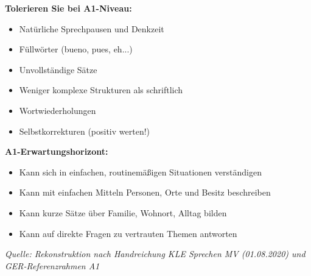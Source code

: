\documentclass[11pt, a4paper]{article}
\begin{document}
\begin{tcolorbox}[colback=hellgrau, colframe=rahmen, boxrule=0.5pt, arc=0pt,
    left=8pt, right=8pt, top=6pt, bottom=6pt,
    title={\textbf{Hinweise zur Bewertung (A1-Niveau)}},
    coltitle=black, colbacktitle=mittelgrau]

\textbf{Tolerieren Sie bei A1-Niveau:}
\begin{itemize}[leftmargin=1.5em, itemsep=1pt, topsep=2pt]
    \item Natürliche Sprechpausen und Denkzeit
    \item Füllwörter (bueno, pues, eh...)
    \item Unvollständige Sätze
    \item Weniger komplexe Strukturen als schriftlich
    \item Wortwiederholungen
    \item Selbstkorrekturen (positiv werten!)
\end{itemize}

\vspace{4pt}

\textbf{A1-Erwartungshorizont:}
\begin{itemize}[leftmargin=1.5em, itemsep=1pt, topsep=2pt]
    \item Kann sich in einfachen, routinemäßigen Situationen verständigen
    \item Kann mit einfachen Mitteln Personen, Orte und Besitz beschreiben
    \item Kann kurze Sätze über Familie, Wohnort, Alltag bilden
    \item Kann auf direkte Fragen zu vertrauten Themen antworten
\end{itemize}

\vspace{4pt}

{\small\textit{Quelle: Rekonstruktion nach Handreichung KLE Sprechen MV (01.08.2020) und GER-Referenzrahmen A1}}
\end{tcolorbox}
\end{document}
